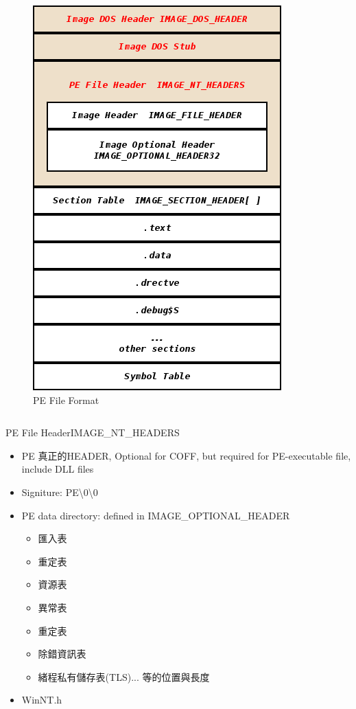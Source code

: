 \begin{frame}
\begin{columns}[t]
\begin{figure}
\begin{center}
                \includegraphics[height=.8\textheight]{./image/PEObjFormat.png}
                \caption{PE File Format}
            \end{center}
        \end{figure}
    \end{columns}
\end{frame}

\begin{frame}[t]{PE File Header}{IMAGE\_NT\_HEADERS}
    \begin{itemize}
        \item PE 真正的HEADER, Optional for COFF, but required for PE-executable file, include DLL files
        \item Signiture: PE\textbackslash 0\textbackslash 0
        \item PE data directory: defined in IMAGE\_OPTIONAL\_HEADER
        \begin{itemize}
            \item 匯入表
            \item 重定表
            \item 資源表
            \item 異常表
            \item 重定表
            \item 除錯資訊表
            \item 緒程私有儲存表(TLS)... 等的位置與長度
        \end{itemize}
        \item WinNT.h
    \end{itemize}
\end{frame}
